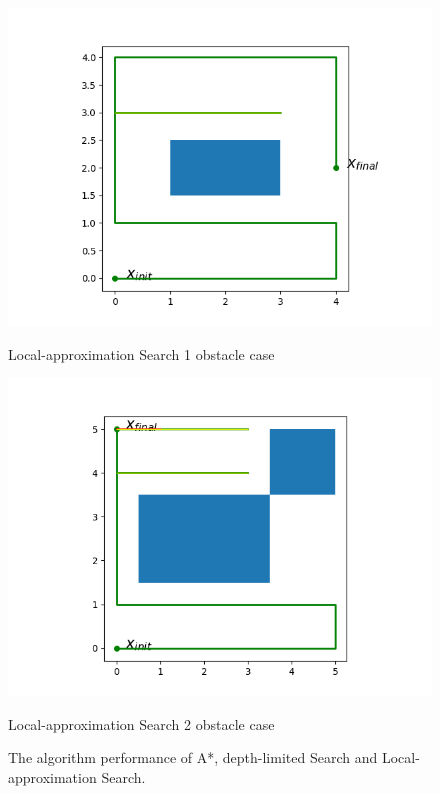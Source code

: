 \documentclass{article}
\begin{document}
\begin{normalsize}
\begin{figure}
\begin{minipage}{.33\textwidth}
      \includegraphics[width=\linewidth]{deliverables/LAS_1_obs.png}
      \caption{Local-approximation Search 1 obstacle case }
    \end{minipage}%
            \begin{minipage}{.33\textwidth}
      \centering
      \includegraphics[width=\linewidth]{deliverables/LAS_2_obs.png}
      \caption{Local-approximation Search 2 obstacle case }
    \end{minipage}
    \caption{The algorithm performance of A*, depth-limited Search and Local-approximation Search.}
    \label{fig:algovsA*}
    \end{figure}
            

\end{normalsize}
\end{document}
